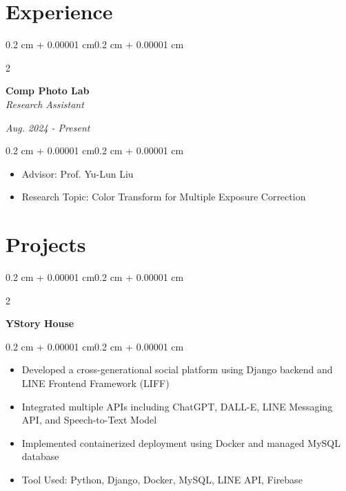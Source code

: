 \documentclass[10pt, letterpaper]{article}
\newenvironment{highlights}{
    \begin{itemize}[
        topsep=0.10 cm,
        parsep=0.10 cm,
        partopsep=0pt,
        itemsep=0pt,
        leftmargin=0.4 cm + 10pt
    ]
}{
    \end{itemize}
}
\newenvironment{onecolentry}{
    \begin{adjustwidth}{0.2 cm + 0.00001 cm}{0.2 cm + 0.00001 cm}
}{
    \end{adjustwidth}
}
\newenvironment{twocolentry}[2][]{
    \onecolentry
    \def\secondColumn{#2}
    \setcolumnwidth{\fill, 4.5 cm}
    \begin{paracol}{2}
}{
    \switchcolumn \raggedleft \secondColumn
    \end{paracol}
    \endonecolentry
}
\let\hrefWithoutArrow\href
\renewcommand{\href}[2]{\hrefWithoutArrow{#1}{\ifthenelse{\equal{#2}{}}{ }{#2 }\raisebox{.15ex}{\footnotesize \faExternalLink*}}}
\begin{document}
    \section{Experience}
        \begin{twocolentry}{
        \textit{Aug. 2024 - Present}}
            \textbf{Comp Photo Lab} \\
            \textit{Research Assistant}
        \end{twocolentry}
        \vspace{0.10 cm}
        \begin{onecolentry}
            \begin{highlights}
                \item Advisor: Prof. Yu-Lun Liu
                \item Research Topic: Color Transform for Multiple Exposure Correction
            \end{highlights}
        \end{onecolentry}

    \section{Projects}

        \begin{twocolentry}{
        \textit{\href{https://github.com/ChuEating1005/YStoryHouse}{Link}}}
            \textbf{YStory House} 
        \end{twocolentry}
        \vspace{0.10 cm}
        \begin{onecolentry}
            \begin{highlights}
                \item Developed a cross-generational social platform using Django backend and LINE Frontend Framework (LIFF)
                \item Integrated multiple APIs including ChatGPT, DALL-E, LINE Messaging API, and Speech-to-Text Model
                \item Implemented containerized deployment using Docker and managed MySQL database
                \item Tool Used: Python, Django, Docker, MySQL, LINE API, Firebase
            \end{highlights}
        \end{onecolentry}
        
\end{document}
